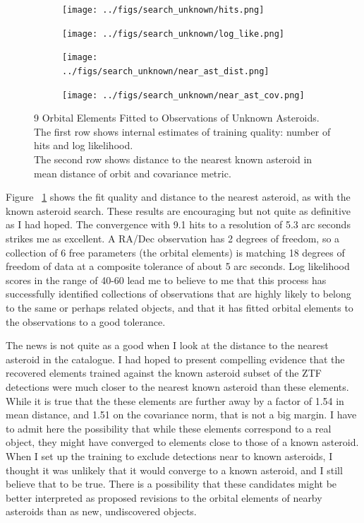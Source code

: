 \begin{figure}[h]
\begin{subfigure}[t]{\subfigwidth\textwidth}
\centering
\texttt{[image: ../figs/search\_unknown/hits.png]}
\end{subfigure}
\hfill
\begin{subfigure}[t]{\subfigwidth\textwidth}
\centering
\texttt{[image: ../figs/search\_unknown/log\_like.png]}
\end{subfigure}
\medskip
\begin{subfigure}[t]{\subfigwidth\textwidth}
\centering
\texttt{[image: ../figs/search\_unknown/near\_ast\_dist.png]}
\end{subfigure}
\hfill
\begin{subfigure}[t]{\subfigwidth\textwidth}
\centering
\texttt{[image: ../figs/search\_unknown/near\_ast\_cov.png]}
\end{subfigure}
\caption[9 Orbital Elements Fitted to Observations of Unknown Asteroids]
{9 Orbital Elements Fitted to Observations of Unknown Asteroids.\\
The first row shows internal estimates of training quality: number of hits and log likelihood.\\
The second row shows distance to the nearest known asteroid in mean distance of orbit and covariance metric.}
\label{fig:TrainUnknown}
\end{figure}

Figure ~\ref{fig:TrainUnknown} shows the fit quality and distance to the nearest asteroid, as with the known asteroid search.
These results are encouraging but not quite as definitive as I had hoped.
The convergence with 9.1 hits to a resolution of 5.3 arc seconds strikes me as excellent.
A RA/Dec observation has 2 degrees of freedom, so a collection of 6 free parameters (the orbital elements)
is matching 18 degrees of freedom of data at a composite tolerance of about 5 arc seconds.
Log likelihood scores in the range of 40-60 lead me to believe to me that this process 
has successfully identified collections of observations that are highly likely to belong to the same or perhaps related objects,
and that it has fitted orbital elements to the observations to a good tolerance.

The news is not quite as a good when I look at the distance to the nearest asteroid in the catalogue.
I had hoped to present compelling evidence that the recovered elements trained against the
known asteroid subset of the ZTF detections were much closer to the nearest known asteroid than these elements.
While it is true that the these elements are further away by a factor of 1.54 in mean distance,
and 1.51 on the covariance norm, that is not a big margin.
I have to admit here the possibility that while these elements correspond to a real object,
they might have converged to elements close to those of a known asteroid.
When I set up the training to exclude detections near to known asteroids,
I thought it was unlikely that it would converge to a known asteroid, and I still believe that to be true.
There is a possibility that these candidates might be better interpreted as proposed revisions to the
orbital elements of nearby asteroids than as new, undiscovered objects.

